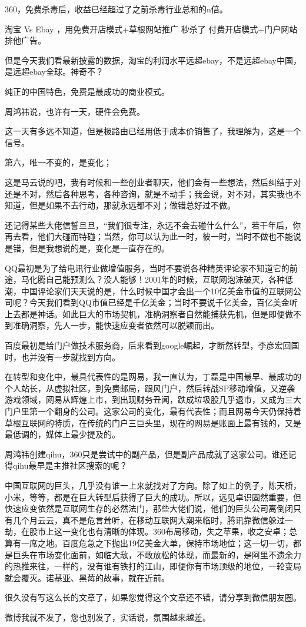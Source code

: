 360，免费杀毒后，收益已经超过了之前杀毒行业总和的n倍。

淘宝 Vs Ebay ，用免费开店模式+草根网站推广  秒杀了 付费开店模式+门户网站排他广告。

但是今天我们看最新披露的数据，淘宝的利润水平远超ebay，不是远超ebay中国，是远超ebay全球。神奇不？


纯正的中国特色，免费是最成功的商业模式。

周鸿祎说，也许有一天，硬件会免费。

这一天有多远不知道，但是极路由已经用低于成本价销售了，我理解为，这是一个信号。


第六，唯一不变的，是变化；

这是马云说的吧，我有时候和一些创业者聊天，他们会有一些想法，然后纠结于对还是不对，然后各种思考，各种咨询，就是不动手；我会说，对不对，其实我也不知道，但是如果不去行动，那就永远都不对；做错总好过不做。

还记得某些大佬信誓旦旦，“我们很专注，永远不会去碰什么什么”，若干年后，你再去看，他们大碰而特碰；当然，你可以认为此一时，彼一时，当时不做也不能说是错，但是我想说的是，变化是一直存在的。

QQ最初是为了给电讯行业做增值服务，当时不要说各种精英评论家不知道它的前途，马化腾自己能预测么？没人能够！2001年的时候，互联网泡沫破灭，各种低潮，中国评论家们天天说的是，什么时候中国才会出一个10亿美金市值的互联网公司呢？今天我们看到QQ市值已经是千亿美金；当时不要说千亿美金，百亿美金听上去都是神话。如此巨大的市场契机，准确洞察者自然能捕获先机，但是即便做不到准确洞察，先人一步，能快速应变者依然可以脱颖而出。

百度最初是给门户做技术服务商，后来看到google崛起，才断然转型，李彦宏回国时，也并没有一步就找到方向。

在转型和变化中，最具代表性的是网易，我一直认为，丁磊是中国最早、最成功的个人站长，从虚拟社区，到免费邮局，跟风门户，然后转战SP移动增值，又逆袭游戏领域，网易从辉煌上市，到出现财务丑闻，跌成垃圾股几乎退市，又成为三大门户里第一个翻身的公司。这家公司的变化，最有代表性；而且网易今天仍保持着草根互联网的特质，在传统的门户三巨头里，现在的网易是账面上最有钱的，又是最低调的，媒体上最少提及的。

周鸿祎创建qihu，360只是尝试中的副产品，但是副产品成就了这家公司。谁还记得qihu最早是主推社区搜索的呢？


中国互联网的巨头，几乎没有谁一上来就找对了方向。除了如上的例子，陈天桥，小米，等等，都是在巨大转型后获得了巨大的成功。所以，远见卓识固然重要，但快速应变依然是互联网生存的必然法门，那些大佬们说，他们的巨头公司离倒闭只有几个月云云，真不是危言耸听，在移动互联网大潮来临时，腾讯靠微信躲过一劫，在股市上这一变化也有清晰的体现。360布局移动，失之苹果，收之安卓；总算有一席之地。百度危急之下抛出19亿美金大单，保持市场地位；这一切一切，都是巨头在市场变化面前，如临大敌，不敢放松的体现，而最新的，是阿里不遗余力的热推来往，一样的，没有谁有铁打的江山，即便你有市场顶级的地位，一轮变局就会覆灭。诺基亚、黑莓的故事，就在近前。


很久没有写这么长的文章了，如果您觉得这个文章还不错，请分享到微信朋友圈。

微博我就不发了，您也别发了，实话说，氛围越来越差。



\clearpage
